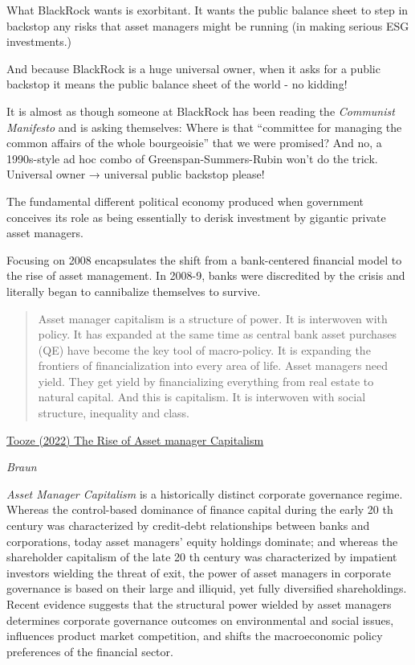 \documentclass[
]{book}
\begin{document}
What BlackRock wants is exorbitant. It wants the public balance sheet to step in backstop any risks that asset managers might be running (in making serious ESG investments.)

And because BlackRock is a huge universal owner, when it asks for a public backstop it means the public balance sheet of the world - no kidding!

It is almost as though someone at BlackRock has been reading the \emph{Communist Manifesto} and is asking themselves: Where is that ``committee for managing the common affairs of the whole bourgeoisie'' that we were promised? And no, a 1990s-style ad hoc combo of Greenspan-Summers-Rubin won't do the trick. Universal owner → universal public backstop please!

The fundamental different political economy produced when government conceives its role as being essentially to derisk investment by gigantic private asset managers.

Focusing on 2008 encapsulates the shift from a bank-centered financial model to the rise of asset management. In 2008-9, banks were discredited by the crisis and literally began to cannibalize themselves to survive.

\begin{quote}
Asset manager capitalism is a structure of power. It is interwoven with policy. It has expanded at the same time as central bank asset purchases (QE) have become the key tool of macro-policy. It is expanding the frontiers of financialization into every area of life. Asset managers need yield. They get yield by financializing everything from real estate to natural capital. And this is capitalism. It is interwoven with social structure, inequality and class.
\end{quote}

\href{https://adamtooze.substack.com/p/chartbook-82-the-rise-of-asset-manager}{Tooze (2022) The Rise of Asset manager Capitalism}

\emph{Braun}

\emph{Asset Manager Capitalism} is a historically distinct corporate governance regime. Whereas
the control-based dominance of finance capital during the early 20 th century was
characterized by credit-debt relationships between banks and corporations, today asset
managers' equity holdings dominate; and whereas the shareholder capitalism of the late
20 th century was characterized by impatient investors wielding the threat of exit, the
power of asset managers in corporate governance is based on their large and illiquid, yet
fully diversified shareholdings. Recent evidence suggests that the structural power
wielded by asset managers determines corporate governance outcomes on environmental
and social issues, influences product market competition, and shifts the macroeconomic
policy preferences of the financial sector.
\end{document}
